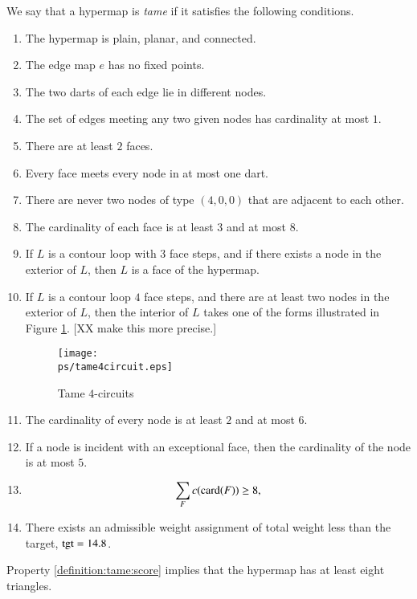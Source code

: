We say that a hypermap is {\it tame\/} if it satisfies the following
conditions.
%

\begin{enumerate}
    \label{definition:tame}
    \item The hypermap is plain, planar, and connected.
    \item The edge map $e$ has no fixed points.
    \item The two darts of each edge lie in different nodes.
    \item The set of edges meeting any two given nodes has cardinality at most $1$.
    \item There are at least $2$ faces.
    \item Every face meets every node in at most one
        dart.
    \item There are never two nodes of type $(4,0,0)$ that are
    adjacent to each other.
    \label{definition:tame:40}
    \item The cardinality of each face is at least $3$ and at most $8$.
    \label{definition:tame:length}

    \item If $L$ is a contour loop with $3$ face steps, and if there exists a node in
    the exterior of $L$, then $L$ is a face of the hypermap.
    \label{definition:tame:3-circuit}

    \item If $L$ is a contour loop  $4$ face steps, and there are at least two nodes
    in the exterior of $L$, then the interior of $L$ takes one of the forms
    illustrated in Figure
    \ref{fig:fourcircuit}.  [XX make this more precise.]
    \label{definition:tame:4-circuit}
    \begin{figure}[htb]
        \centering
        \texttt{[image: \\ps/tame4circuit.eps]}
        \caption{Tame $4$-circuits}
        \label{fig:fourcircuit}
    \end{figure}

    \item The cardinality of every node is at least $2$ and at most
    $6$.
    \label{definition:tame:degree}

    \item If a node is incident with an exceptional face,
        then the cardinality of the node is at most $5$.
    \label{definition:tame:degreeE}

    \item $$\sum_F c({\operatorname{card}}(F)) \ge 8,$$
    \label{definition:tame:score}


    \item There exists an admissible weight assignment
        of total weight less than the target, ${\operatorname{tgt}}=14.8$.
    \label{definition:tame:squander}



\end{enumerate}
%
Property \ref{definition:tame:score} implies that the hypermap has
at least eight triangles.


